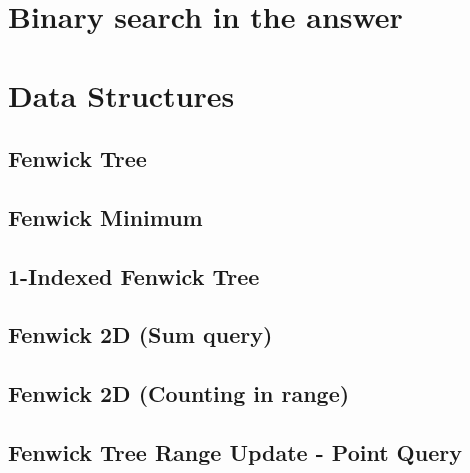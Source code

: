 \documentclass[10pt]{article}
\begin{document}
\begin{multicols*}{2}

\section{Binary search in the answer}



\section{Data Structures}

\subsection{Fenwick Tree}


\subsection{Fenwick Minimum}


\subsection{1-Indexed Fenwick Tree}


\subsection{Fenwick 2D (Sum query)}


\subsection{Fenwick 2D (Counting in range)}


\subsection{Fenwick Tree Range Update - Point Query}



\end{multicols*}
\end{document}
